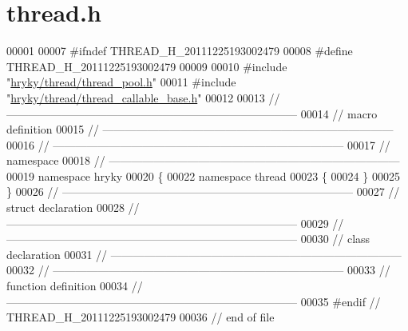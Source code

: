 \hypertarget{thread_8h_source}{\section{thread.\-h}
}

\begin{DoxyCode}
00001 
00007 \textcolor{preprocessor}{#ifndef THREAD\_H\_20111225193002479}
00008 \textcolor{preprocessor}{}\textcolor{preprocessor}{#define THREAD\_H\_20111225193002479}
00009 \textcolor{preprocessor}{}
00010 \textcolor{preprocessor}{#include "\hyperlink{thread__pool_8h}{hryky/thread/thread_pool.h}"}
00011 \textcolor{preprocessor}{#include "\hyperlink{thread__callable__base_8h}{hryky/thread/thread_callable_base.h}"}
00012 
00013 \textcolor{comment}{//
      ------------------------------------------------------------------------------}
00014 \textcolor{comment}{// macro definition}
00015 \textcolor{comment}{//
      ------------------------------------------------------------------------------}
00016 \textcolor{comment}{//
      ------------------------------------------------------------------------------}
00017 \textcolor{comment}{// namespace}
00018 \textcolor{comment}{//
      ------------------------------------------------------------------------------}
00019 \textcolor{keyword}{namespace }hryky
00020 \{
00022 \textcolor{keyword}{namespace }thread
00023 \{
00024 \}
00025 \}
00026 \textcolor{comment}{//
      ------------------------------------------------------------------------------}
00027 \textcolor{comment}{// struct declaration}
00028 \textcolor{comment}{//
      ------------------------------------------------------------------------------}
00029 \textcolor{comment}{//
      ------------------------------------------------------------------------------}
00030 \textcolor{comment}{// class declaration}
00031 \textcolor{comment}{//
      ------------------------------------------------------------------------------}
00032 \textcolor{comment}{//
      ------------------------------------------------------------------------------}
00033 \textcolor{comment}{// function definition}
00034 \textcolor{comment}{//
      ------------------------------------------------------------------------------}
00035 \textcolor{preprocessor}{#endif // THREAD\_H\_20111225193002479}
00036 \textcolor{preprocessor}{}\textcolor{comment}{// end of file}
\end{DoxyCode}
